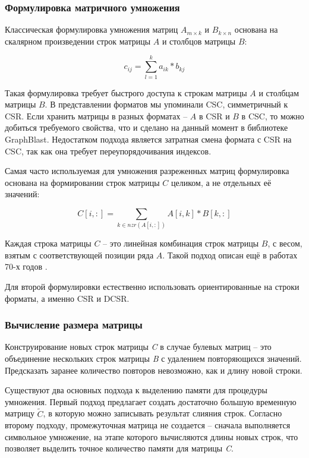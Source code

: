 \documentclass[14pt]{extarticle}
\newcommand{\txt}{\textit}
\begin{document}
	\subsubsection*{Формулировка матричного умножения}
	
	Классическая формулировка умножения матриц $A_{m\times k}$ и  $B_{k\times n}$ основана на скалярном произведении строк матрицы $A$ и столбцов матрицы $B$:
	
	$$c_{ij} = \sum_{l=1}^{k}a_{ik}*b_{kj}$$
	
	Такая формулировка требует быстрого доступа к строкам матрицы $A$ и столбцам матрицы $B$. В представлении форматов мы упоминали CSC, симметричный к CSR. Если хранить матрицы в разных форматах -- $A$ в CSR и $B$ в CSC, то можно добиться требуемого свойства, что и сделано на данный момент в библиотеке GraphBlast\cite{graphblast}. Недостатком подхода является затратная смена формата с CSR на CSC, так как она требует переупорядочивания индексов.
	
	Самая часто используемая для умножения разреженных матриц формулировка основана на формировании строк матрицы $C$ целиком, а не отдельных её значений:
	
	$$C[i,:]=\sum_{k\in nzr(A[i, :])}A[i, k] * B[k, :]$$
	
	Каждая строка матрицы $C$ -- это линейная комбинация строк матрицы $B$, с весом, взятым с соответствующей позиции ряда $A$. Такой подход описан ещё в работах 70-х годов \cite{gustavson}.  
	
	Для второй формулировки естественно использовать ориентированные на строки форматы, а именно CSR и DCSR. 
	
	\subsubsection*{Вычисление размера матрицы} 
	
	Конструирование новых строк матрицы \txt{C} в случае булевых матриц – это объединение нескольких строк матрицы \txt{B} с удалением повторяющихся значений. Предсказать заранее количество повторов невозможно, как и длину новой строки.
	
	Существуют два основных подхода к выделению памяти для процедуры умножения. 
	Первый подход предлагает создать достаточно большую временную матрицу $\tilde{C}$, в которую можно записывать результат слияния строк. Согласно второму подходу, промежуточная матрица не создается -- сначала выполняется символьное умножение, на этапе которого вычисляются длины новых строк, что позволяет выделить точное количество памяти для матрицы \txt{C}. 
	
\end{document}
